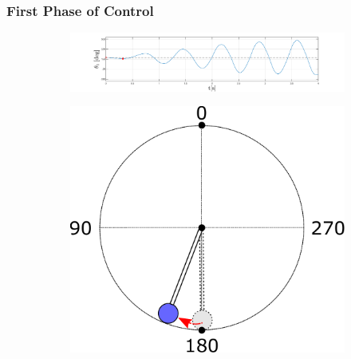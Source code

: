 \documentclass[]{beamer}
\begin{document}
\begin{frame}
	\frametitle{First Phase of Control}
	\begin{figure}[H]
		\centering
		\begin{subfigure}
			\centering
			\includegraphics[scale=0.25]{images/swings2/swing2.pdf}  
		\end{subfigure}
		\begin{subfigure}
			\centering
			\includegraphics[scale=0.25]{images/swing1.pdf}  
		\end{subfigure}
	\end{figure}
\end{frame}
\end{document}
